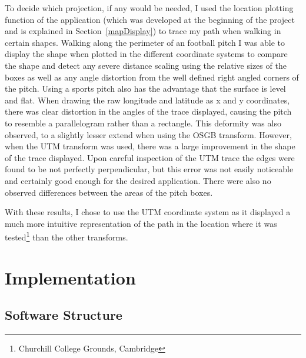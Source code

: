 To decide which projection, if any would be needed, I used the location plotting function of the application (which was developed at the beginning of the project and is explained in Section~\ref{mapDisplay}) to trace my path when walking in certain shapes.
Walking along the perimeter of an football pitch I was able to display the shape when plotted in the different coordinate systems to compare the shape and detect any severe distance scaling using the relative sizes of the boxes as well as any angle distortion from the well defined right angled corners of the pitch. Using a sports pitch also has the advantage that the surface is level and flat.
When drawing the raw longitude and latitude as x and y coordinates, there was clear distortion in the angles of the trace displayed, causing the pitch to resemble a parallelogram rather than a rectangle. This deformity was also observed, to a slightly lesser extend when using the OSGB transform. However, when the UTM transform was used, there was a large improvement in the shape of the trace displayed. Upon careful inspection of the UTM trace the edges were found to be not perfectly perpendicular, but this error was not easily noticeable and certainly good enough for the desired application. There were also no observed differences between the areas of the pitch boxes.

With these results, I chose to use the UTM coordinate system as it displayed a much more intuitive representation of the path in the location where it was tested\footnote{Churchill College Grounds, Cambridge} than the other transforms.

\cleardoublepage
\chapter{Implementation}

\section{Software Structure}

